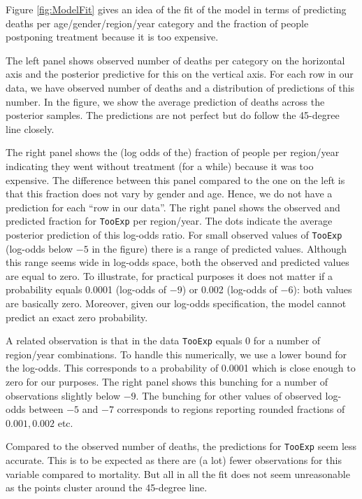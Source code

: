 \documentclass[a4paper,12pt]{article}
\begin{document}
Figure \ref{fig:ModelFit} gives an idea of the fit of the model in terms of predicting deaths per age/gender/region/year category and the fraction of people postponing treatment because it is too expensive.

The left panel shows observed number of deaths per category on the horizontal axis and the posterior predictive for this on the vertical axis. For each row in our data, we have observed number of deaths and a distribution of predictions of this number. In the figure, we show the average prediction of deaths across the posterior samples. The predictions are not perfect but do follow the 45-degree line closely.

The right panel shows the (log odds of the) fraction of people per region/year indicating they went without treatment (for a while) because it was too expensive. The difference between this panel compared to the one on the left is that this fraction does not vary by gender and age. Hence, we do not have a prediction for each ``row in our data''. The right panel shows the observed and predicted fraction for \texttt{TooExp} per region/year. The dots indicate the average posterior prediction of this log-odds ratio. For small observed values of \texttt{TooExp} (log-odds below \(-5\) in the figure) there is a range of predicted values. Although this range seems wide in log-odds space, both the observed and predicted values are equal to zero. To illustrate, for practical purposes it does not matter if a probability equals 0.0001 (log-odds of \(-9\)) or 0.002 (log-odds of \(-6\)): both values are basically zero. Moreover, given our log-odds specification, the model cannot predict an exact zero probability.

A related observation is that in the data \texttt{TooExp} equals 0 for a number of region/year combinations. To handle this numerically, we use a lower bound for the log-odds. This corresponds to a probability of 0.0001 which is close enough to zero for our purposes. The right panel shows this bunching for a number of observations slightly below \(-9\). The bunching for other values of observed log-odds between \(-5\) and \(-7\) corresponds to regions reporting rounded fractions of \(0.001,0.002\) etc.

Compared to the observed number of deaths, the predictions for \texttt{TooExp} seem less accurate. This is to be expected as there are (a lot) fewer observations for this variable compared to mortality. But all in all the fit does not seem unreasonable as the points cluster around the 45-degree line.
\end{document}
